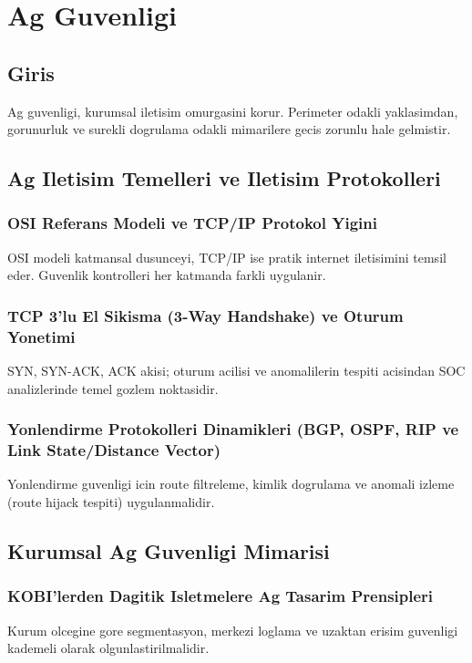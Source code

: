 ﻿\chapter{Ag Guvenligi}

\section*{Giris}
Ag guvenligi, kurumsal iletisim omurgasini korur. Perimeter odakli yaklasimdan, gorunurluk ve surekli dogrulama odakli mimarilere gecis zorunlu hale gelmistir.

\section{Ag Iletisim Temelleri ve Iletisim Protokolleri}
\subsection{OSI Referans Modeli ve TCP/IP Protokol Yigini}
OSI modeli katmansal dusunceyi, TCP/IP ise pratik internet iletisimini temsil eder. Guvenlik kontrolleri her katmanda farkli uygulanir.

\subsection{TCP 3'lu El Sikisma (3-Way Handshake) ve Oturum Yonetimi}
SYN, SYN-ACK, ACK akisi; oturum acilisi ve anomalilerin tespiti acisindan SOC analizlerinde temel gozlem noktasidir.

\subsection{Yonlendirme Protokolleri Dinamikleri (BGP, OSPF, RIP ve Link State/Distance Vector)}
Yonlendirme guvenligi icin route filtreleme, kimlik dogrulama ve anomali izleme (route hijack tespiti) uygulanmalidir.

\section{Kurumsal Ag Guvenligi Mimarisi}
\subsection{KOBI'lerden Dagitik Isletmelere Ag Tasarim Prensipleri}
Kurum olcegine gore segmentasyon, merkezi loglama ve uzaktan erisim guvenligi kademeli olarak olgunlastirilmalidir.

